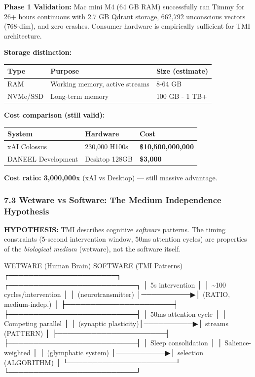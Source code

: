 \documentclass[
]{article}
\newenvironment{Shaded}{}{}
\newcommand{\NormalTok}[1]{#1}
\begin{document}
\textbf{Phase 1 Validation:} Mac mini M4 (64 GB RAM) successfully ran
Timmy for 26+ hours continuous with 2.7 GB Qdrant storage, 662,792
unconscious vectors (768-dim), and zero crashes. Consumer hardware is
empirically sufficient for TMI architecture.

\textbf{Storage distinction:}

\begin{longtable}[]{@{}lll@{}}
\toprule\noalign{}
Type & Purpose & Size (estimate) \\
\midrule\noalign{}
\endhead
\bottomrule\noalign{}
\endlastfoot
RAM & Working memory, active streams & 8-64 GB \\
NVMe/SSD & Long-term memory & 100 GB - 1 TB+ \\
\end{longtable}

\textbf{Cost comparison (still valid):}

\begin{longtable}[]{@{}lll@{}}
\toprule\noalign{}
System & Hardware & Cost \\
\midrule\noalign{}
\endhead
\bottomrule\noalign{}
\endlastfoot
xAI Colossus & 230,000 H100s & \textbf{\$10,500,000,000} \\
DANEEL Development & Desktop 128GB & \textbf{\$3,000} \\
\end{longtable}

\textbf{Cost ratio: 3,000,000x} (xAI vs Desktop) --- still massive
advantage.

\hypertarget{wetware-vs-software-the-medium-independence-hypothesis}{%
\subsubsection{7.3 Wetware vs Software: The Medium Independence
Hypothesis}\label{wetware-vs-software-the-medium-independence-hypothesis}}

\textbf{HYPOTHESIS:} TMI describes cognitive \emph{software} patterns.
The timing constraints (5-second intervention window, 50ms attention
cycles) are properties of the \emph{biological medium} (wetware), not
the software itself.

\begin{Shaded}
\begin{Highlighting}[]
\NormalTok{  WETWARE (Human Brain)              SOFTWARE (TMI Patterns)}
\NormalTok{ ┌──────────────────────┐           ┌──────────────────────────┐}
\NormalTok{ │ 5s intervention      │           │ \textasciitilde{}100 cycles/intervention │}
\NormalTok{ │ (neurotransmitter)   │──────────▶│ (RATIO, medium{-}indep.)   │}
\NormalTok{ ├──────────────────────┤           ├──────────────────────────┤}
\NormalTok{ │ 50ms attention cycle │           │ Competing parallel       │}
\NormalTok{ │ (synaptic plasticity)│──────────▶│ streams (PATTERN)        │}
\NormalTok{ ├──────────────────────┤           ├──────────────────────────┤}
\NormalTok{ │ Sleep consolidation  │           │ Salience{-}weighted        │}
\NormalTok{ │ (glymphatic system)  │──────────▶│ selection (ALGORITHM)    │}
\NormalTok{ └──────────────────────┘           └──────────────────────────┘}
\end{Highlighting}
\end{Shaded}
\end{document}
